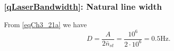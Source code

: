 \chapter{}

\section{}

\subsection{\ref{qLaserBandwidth}: Natural line width}
From \eqref{eqCh3_21a}
we have
\[
D = \frac{A}{2 \bar{n}_{st}} = \frac{10^6}{2 \cdot 10^6} = 0.5 \mbox{Hz.}
\]

